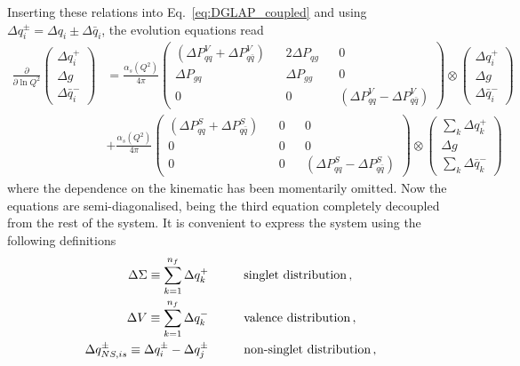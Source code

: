 Inserting these relations into Eq.~\eqref{eq:DGLAP_coupled} and using $\Delta q_{i}^{\pm} = \Delta q_{i} \pm \Delta \bar{q}_{i}$,
the evolution equations read 
\begin{equation}
  \begin{split}
    \frac{\partial}{\partial \ln Q^2} 
    \left(\begin{matrix}
      \Delta q_i^{+} \\
      \Delta g \\
      \Delta \bar{q}_i^{-}
    \end{matrix} \right) & = \frac{\alpha_{s}(Q^2)}{4 \pi} 
    \left(\begin{matrix}
      (\Delta P_{qq}^{V} + \Delta P_{q\bar{q}}^{V}) && 2 \Delta P_{qg} && 0 \\
      \Delta P_{gq} && \Delta P_{gg} && 0 \\
      0 && 0 && (\Delta P_{qq}^{V} - \Delta P_{q\bar{q}}^{V})
    \end{matrix} \right) \otimes
    \left(\begin{matrix}
      \Delta q_i^{+} \\
      \Delta g \\
      \Delta \bar{q}_i^{-}
    \end{matrix} \right) 
    \\[10pt]
    & + \frac{\alpha_{s}(Q^2)}{4 \pi}
    \left(\begin{matrix}
      (\Delta P_{qq}^{S} + \Delta P_{q \bar{q}}^{S}) && 0 && 0 \\
      0 && 0 && 0 \\
      0 && 0 && (\Delta P_{qq}^{S} - \Delta P_{q\bar{q}}^{S})
    \end{matrix} \right) 
    \otimes
    \left(\begin{matrix}
      \sum_{k} \Delta q_k^{+} \\
      \Delta g \\
      \sum_{k} \Delta \bar{q}_k^{-}
    \end{matrix} \right)
  \end{split}
\end{equation}
where the dependence on the kinematic has been momentarily omitted. Now the equations are semi-diagonalised, being the third equation completely decoupled from the rest of the system. It is convenient to express the system using the following definitions
\begin{equation}
  \begin{split}
     \Delta \Sigma \equiv \sum_{k=1}^{n_{f}} \Delta q_{k}^{+}  \hspace{10mm} & \T{singlet distribution}\, ,\\
     \Delta V \equiv \sum_{k=1}^{n_{f}} \Delta q_{k}^{-}  \hspace{10mm} & \T{valence distribution}\,, \\
     \Delta q_{NS,is}^{\pm} \equiv \Delta q_{i}^{\pm} - \Delta q_{j}^{\pm} \hspace{10mm} & \T{non-singlet distribution} \,,
  \end{split}
  \label{eq:evb_dist}
\end{equation}
